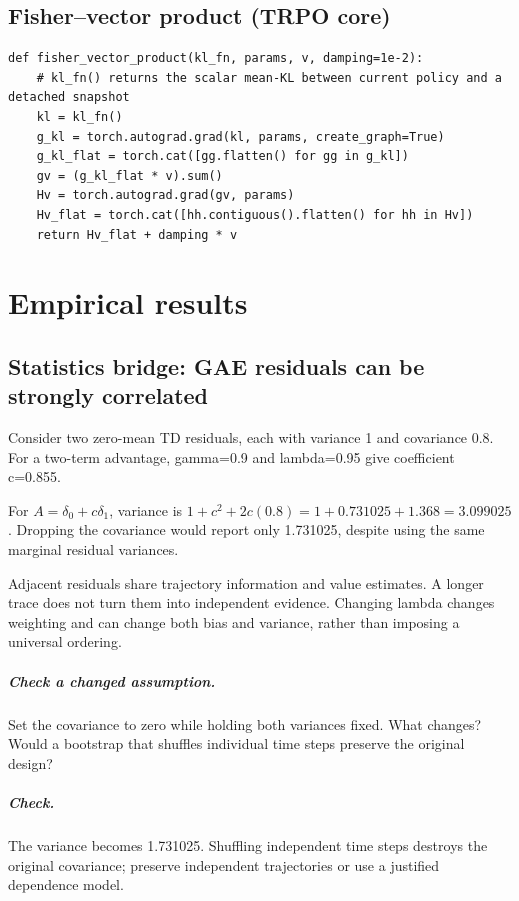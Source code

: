 \documentclass[11pt,oneside]{scrbook}
\begin{document}
\section{Fisher--vector product (TRPO core)}

\begin{verbatim}
def fisher_vector_product(kl_fn, params, v, damping=1e-2):
    # kl_fn() returns the scalar mean-KL between current policy and a detached snapshot
    kl = kl_fn()
    g_kl = torch.autograd.grad(kl, params, create_graph=True)
    g_kl_flat = torch.cat([gg.flatten() for gg in g_kl])
    gv = (g_kl_flat * v).sum()
    Hv = torch.autograd.grad(gv, params)
    Hv_flat = torch.cat([hh.contiguous().flatten() for hh in Hv])
    return Hv_flat + damping * v
\end{verbatim}

\chapter{Empirical results}

\section{Statistics bridge: GAE residuals can be strongly correlated}
\begin{example}
Consider two zero-mean TD residuals, each with variance 1 and covariance 0.8. For a two-term advantage, gamma=0.9 and lambda=0.95 give coefficient c=0.855.

For $A=\delta_0+c\delta_1$, variance is $1+c^2+2c(0.8)=1+0.731025+1.368=3.099025$. Dropping the covariance would report only 1.731025, despite using the same marginal residual variances.
\end{example}
Adjacent residuals share trajectory information and value estimates. A longer trace does not turn them into independent evidence. Changing lambda changes weighting and can change both bias and variance, rather than imposing a universal ordering.

\paragraph{Check a changed assumption.} Set the covariance to zero while holding both variances fixed. What changes? Would a bootstrap that shuffles individual time steps preserve the original design?
\paragraph{Check.} The variance becomes 1.731025. Shuffling independent time steps destroys the original covariance; preserve independent trajectories or use a justified dependence model.
\end{document}
